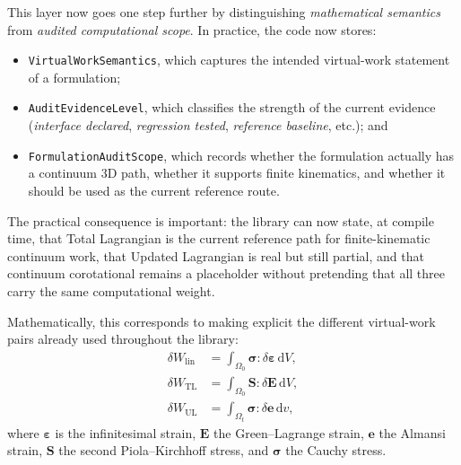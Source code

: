 This layer now goes one step further by distinguishing \emph{mathematical
semantics} from \emph{audited computational scope}.  In practice, the code now
stores:
\begin{itemize}
  \item \texttt{VirtualWorkSemantics}, which captures the intended virtual-work
  statement of a formulation;
  \item \texttt{AuditEvidenceLevel}, which classifies the strength of the
  current evidence (\emph{interface declared}, \emph{regression tested},
  \emph{reference baseline}, etc.); and
  \item \texttt{FormulationAuditScope}, which records whether the formulation
  actually has a continuum 3D path, whether it supports finite kinematics, and
  whether it should be used as the current reference route.
\end{itemize}

The practical consequence is important: the library can now state, at compile
time, that Total Lagrangian is the current reference path for finite-kinematic
continuum work, that Updated Lagrangian is real but still partial, and that
continuum corotational remains a placeholder without pretending that all three
carry the same computational weight.

Mathematically, this corresponds to making explicit the different virtual-work
pairs already used throughout the library:
\begin{align}
  \delta W_{\mathrm{lin}} &= \int_{\Omega_0} \boldsymbol{\sigma} :
    \delta\boldsymbol{\varepsilon}\,\mathrm{d}V,\\
  \delta W_{\mathrm{TL}} &= \int_{\Omega_0} \mathbf{S} :
    \delta\mathbf{E}\,\mathrm{d}V,\\
  \delta W_{\mathrm{UL}} &= \int_{\Omega_t} \boldsymbol{\sigma} :
    \delta\mathbf{e}\,\mathrm{d}v,
\end{align}
where \(\boldsymbol{\varepsilon}\) is the infinitesimal strain,
\(\mathbf{E}\) the Green--Lagrange strain, \(\mathbf{e}\) the Almansi strain,
\(\mathbf{S}\) the second Piola--Kirchhoff stress, and
\(\boldsymbol{\sigma}\) the Cauchy stress.

